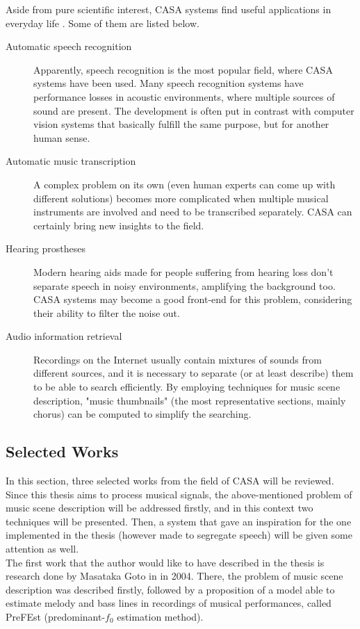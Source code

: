 Aside from pure scientific interest, CASA systems find useful applications in everyday life \cite{Wang2006}. Some of them are listed below.

\begin{description}
	\item[Automatic speech recognition] Apparently, speech recognition is the most popular field, where CASA systems have been used. Many speech recognition systems have performance losses in acoustic environments, where multiple sources of sound are present. The development is often put in contrast with computer vision systems that basically fulfill the same purpose, but for another human sense.
	\item[Automatic music transcription] A complex problem on its own (even human experts can come up with different solutions) becomes more complicated when multiple musical instruments are involved and need to be transcribed separately. CASA can certainly bring new insights to the field.
	\item[Hearing prostheses] Modern hearing aids made for people suffering from hearing loss don't separate speech in noisy environments, amplifying the background too. CASA systems may become a good front-end for this problem, considering their ability to filter the noise out.
	\item[Audio information retrieval] Recordings on the Internet usually contain mixtures of sounds from different sources, and it is necessary to separate (or at least describe) them to be able to search efficiently. By employing techniques for music scene description, "music thumbnails" (the most representative sections, mainly chorus) can be computed to simplify the searching.
\end{description}

\subsection{Selected Works}

In this section, three selected works from the field of CASA will be reviewed. Since this thesis aims to process musical signals, the above-mentioned problem of music scene description will be addressed firstly, and in this context two techniques will be presented. Then, a system that gave an inspiration for the one implemented in the thesis (however made to segregate speech) will be given some attention as well.\\

The first work that the author would like to have described in the thesis is research done by Masataka Goto in \cite{Goto2004} in 2004. There, the problem of music scene description was described firstly, followed by a proposition of a model able to estimate melody and bass lines in recordings of musical performances, called PreFEst (predominant-$f_0$ estimation method).\\

